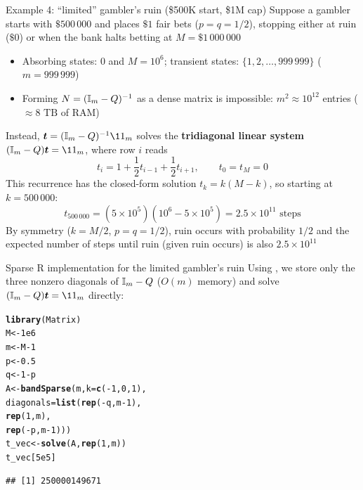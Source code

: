\documentclass[aspectratio=169]{beamer}\usepackage[]{graphicx}\usepackage[]{xcolor}
\makeatletter
\newcommand{\hlnum}[1]{\textcolor[rgb]{0.686,0.059,0.569}{#1}}%
\newcommand{\hlopt}[1]{\textcolor[rgb]{0,0,0}{#1}}%
\newcommand{\hldef}[1]{\textcolor[rgb]{0.345,0.345,0.345}{#1}}%
\newcommand{\hlkwb}[1]{\textcolor[rgb]{0.69,0.353,0.396}{#1}}%
\newcommand{\hlkwc}[1]{\textcolor[rgb]{0.333,0.667,0.333}{#1}}%
\newcommand{\hlkwd}[1]{\textcolor[rgb]{0.737,0.353,0.396}{\textbf{#1}}}%
\newenvironment{kframe}{%
 \def\at@end@of@kframe{}%
 \ifinner\ifhmode%
  \def\at@end@of@kframe{\end{minipage}}%
  \begin{minipage}{\columnwidth}%
 \fi\fi%
 \def\FrameCommand##1{\hskip\@totalleftmargin \hskip-\fboxsep
 \colorbox{shadecolor}{##1}\hskip-\fboxsep
     \hskip-\linewidth \hskip-\@totalleftmargin \hskip\columnwidth}%
 \MakeFramed {\advance\hsize-\width
   \@totalleftmargin\z@ \linewidth\hsize
   \@setminipage}}%
 {\par\unskip\endMakeFramed%
 \at@end@of@kframe}
\newenvironment{knitrout}{}{} %
\providecommand{\bt}{\bm{t}}
\makeatother
\begin{document}
\begin{frame}{Example 4: ``limited'' gambler's ruin (\$500K start, \$1M cap)}
Suppose a gambler starts with $\$500\,000$ and places $\$1$ fair bets ($p = q = 1/2$), stopping either at ruin ($\$0$) or when the bank halts betting at $M = \$1\,000\,000$
\begin{itemize}
\item Absorbing states: $0$ and $M = 10^6$; transient states: $\{1, 2, \ldots, 999\,999\}$ ($m = 999\,999$)
\item Forming $N = (\mathbb{I}_m - Q)^{-1}$ as a dense matrix is impossible: $m^2 \approx 10^{12}$ entries ($\approx 8\text{ TB}$ of RAM)
\end{itemize}
\vfill
Instead, $\bt = (\II_m - Q)^{-1}\11_m$ solves the \textbf{tridiagonal linear system} $(\II_m - Q)\bt = \11_m$, where row $i$ reads
\[
t_i = 1 + \frac{1}{2} t_{i-1} + \frac{1}{2} t_{i+1}, \qquad t_0 = t_M = 0
\]
This recurrence has the closed-form solution $t_k = k(M - k)$, so starting at $k = 500\,000$:
\[
t_{500\,000} = (5 \times 10^5)(10^6 - 5 \times 10^5) = 2.5 \times 10^{11} \text{ steps}
\]
By symmetry ($k = M/2$, $p = q = 1/2$), ruin occurs with probability $1/2$ and the expected number of steps until ruin (given ruin occurs) is also $2.5 \times 10^{11}$
\end{frame}

\begin{frame}[fragile]{Sparse R implementation for the limited gambler's ruin}
Using , we store only the three nonzero diagonals of $\mathbb{I}_m - Q$ ($O(m)$ memory) and solve $(\II_m - Q)\bt = \11_m$ directly:
\begin{knitrout}
\color{fgcolor}\begin{kframe}
\begin{alltt}
\hlkwd{library}\hldef{(Matrix)}
\hldef{M} \hlkwb{<-} \hlnum{1e6}
\hldef{m} \hlkwb{<-} \hldef{M} \hlopt{-} \hlnum{1}
\hldef{p} \hlkwb{<-} \hlnum{0.5}
\hldef{q} \hlkwb{<-} \hlnum{1} \hlopt{-} \hldef{p}
\hldef{A} \hlkwb{<-} \hlkwd{bandSparse}\hldef{(m,} \hlkwc{k} \hldef{=} \hlkwd{c}\hldef{(}\hlopt{-}\hlnum{1}\hldef{,} \hlnum{0}\hldef{,} \hlnum{1}\hldef{),}
                \hlkwc{diagonals} \hldef{=} \hlkwd{list}\hldef{(}\hlkwd{rep}\hldef{(}\hlopt{-}\hldef{q, m} \hlopt{-} \hlnum{1}\hldef{),}
                                 \hlkwd{rep}\hldef{(}\hlnum{1}\hldef{, m),}
                                 \hlkwd{rep}\hldef{(}\hlopt{-}\hldef{p, m} \hlopt{-} \hlnum{1}\hldef{)))}
\hldef{t_vec} \hlkwb{<-} \hlkwd{solve}\hldef{(A,} \hlkwd{rep}\hldef{(}\hlnum{1}\hldef{, m))}
\hldef{t_vec[}\hlnum{5e5}\hldef{]}
\end{alltt}
\begin{verbatim}
## [1] 250000149671
\end{verbatim}
\end{kframe}
\end{knitrout}
\end{frame}
\end{document}

